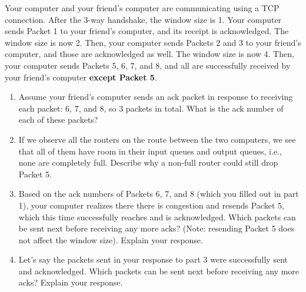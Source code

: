 \documentclass[10pt]{article}
\newenvironment{problem}[2][]{\begin{trivlist}
\item[\hskip \labelsep {\bfseries #1}\hskip \labelsep {\bfseries #2.}]}{\end{trivlist}}
\begin{document}
\newpage
\begin{problem}{5: TCP Congestion Control}
Your computer and your friend's computer are communicating using a TCP connection. After the 3-way handshake, the window size is 1. Your computer sends Packet 1 to your friend's computer, and its receipt is acknowledged. The window size is now 2. Then, your computer sends Packets 2 and 3 to your friend's computer, and those are acknowledged as well. The window size is now 4. Then, your computer sends Packets 5, 6, 7, and 8, and all are successfully received by your friend's computer \textbf{except Packet 5}.
\begin{enumerate}
    \item Assume your friend's computer sends an ack packet in response to receiving each packet: 6, 7, and 8, so 3 packets in total. What is the ack number of each of these packets?
    \item If we observe all the routers on the route between the two computers, we see that all of them have room in their input queues and output queues, i.e., none are completely full. Describe why a non-full router could still drop Packet 5.
    \item Based on the ack numbers of Packets 6, 7, and 8 (which you filled out in part 1), your computer realizes there there is congestion and resends Packet 5, which this time successfully reaches and is acknowledged. Which packets can be sent next before receiving any more acks? (Note: resending Packet 5 does not affect the window size). Explain your response.
    \item Let's say the packets sent in your response to part 3 were successfully sent and acknowledged. Which packets can be sent next before receiving any more acks? Explain your response.
\end{enumerate}
\end{problem}
\newpage
\end{document}
